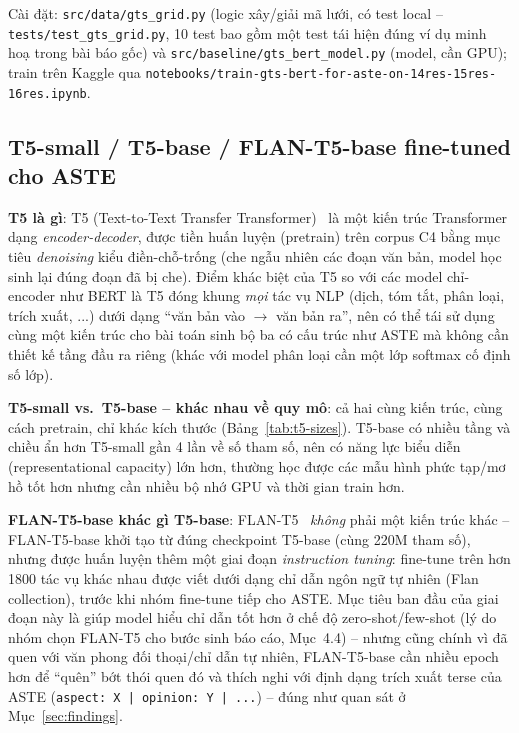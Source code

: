 \documentclass[11pt,a4paper]{article}
\begin{document}
Cài đặt: \texttt{src/\allowbreak data/\allowbreak gts\_\allowbreak grid.py} (logic xây/giải mã lưới, có test
local -- \texttt{tests/\allowbreak test\_\allowbreak gts\_\allowbreak grid.py}, 10 test bao gồm một test tái
hiện đúng ví dụ minh hoạ trong bài báo gốc) và
\texttt{src/\allowbreak baseline/\allowbreak gts\_\allowbreak bert\_\allowbreak model.py} (model, cần GPU); train trên
Kaggle qua \texttt{notebooks/\allowbreak train-\allowbreak gts-\allowbreak bert-\allowbreak for-\allowbreak aste-\allowbreak on-\allowbreak 14res-\allowbreak 15res-\allowbreak 16res.ipynb}.

\subsection{T5-small / T5-base / FLAN-T5-base fine-tuned cho ASTE}

\textbf{T5 là gì}: T5 (Text-to-Text Transfer Transformer)~\cite{t5} là một
kiến trúc Transformer dạng \emph{encoder-decoder}, được tiền huấn luyện
(pretrain) trên corpus C4 bằng mục tiêu \emph{denoising} kiểu điền-chỗ-trống
(che ngẫu nhiên các đoạn văn bản, model học sinh lại đúng đoạn đã bị che).
Điểm khác biệt của T5 so với các model chỉ-encoder như BERT là T5 đóng
khung \emph{mọi} tác vụ NLP (dịch, tóm tắt, phân loại, trích xuất, ...)
dưới dạng ``văn bản vào $\to$ văn bản ra'', nên có thể tái sử dụng cùng
một kiến trúc cho bài toán sinh bộ ba có cấu trúc như ASTE mà không cần
thiết kế tầng đầu ra riêng (khác với model phân loại cần một lớp softmax
cố định số lớp).

\textbf{T5-small vs.\ T5-base -- khác nhau về quy mô}: cả hai cùng kiến
trúc, cùng cách pretrain, chỉ khác kích thước (Bảng~\ref{tab:t5-sizes}).
T5-base có nhiều tầng và chiều ẩn hơn T5-small gần 4 lần về số tham số,
nên có năng lực biểu diễn (representational capacity) lớn hơn, thường học
được các mẫu hình phức tạp/mơ hồ tốt hơn nhưng cần nhiều bộ nhớ GPU và
thời gian train hơn.

\textbf{FLAN-T5-base khác gì T5-base}: FLAN-T5~\cite{flant5} \emph{không}
phải một kiến trúc khác -- FLAN-T5-base khởi tạo từ đúng checkpoint
T5-base (cùng 220M tham số), nhưng được huấn luyện thêm một giai đoạn
\emph{instruction tuning}: fine-tune trên hơn 1800 tác vụ khác nhau được
viết dưới dạng chỉ dẫn ngôn ngữ tự nhiên (Flan collection), trước khi
nhóm fine-tune tiếp cho ASTE. Mục tiêu ban đầu của giai đoạn này là giúp
model hiểu chỉ dẫn tốt hơn ở chế độ zero-shot/few-shot (lý do nhóm chọn
FLAN-T5 cho bước sinh báo cáo, Mục~4.4) -- nhưng cũng chính vì đã quen với
văn phong đối thoại/chỉ dẫn tự nhiên, FLAN-T5-base cần nhiều epoch hơn để
``quên'' bớt thói quen đó và thích nghi với định dạng trích xuất terse của
ASTE (\texttt{aspect: X | opinion: Y | ...}) -- đúng như quan sát ở
Mục~\ref{sec:findings}.
\end{document}
